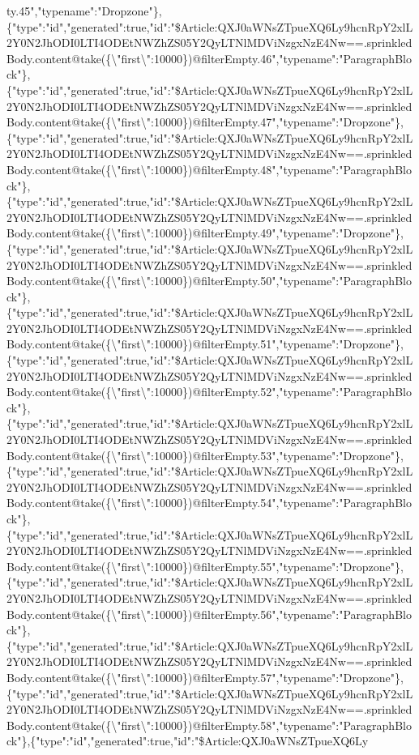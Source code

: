 ty.45","typename":"Dropzone"\},\{"type":"id","generated":true,"id":"\$Article:QXJ0aWNsZTpueXQ6Ly9hcnRpY2xlL2Y0N2JhODI0LTI4ODEtNWZhZS05Y2QyLTNlMDViNzgxNzE4Nw==.sprinkledBody.content@take(\{\textbackslash{}"first\textbackslash{}":10000\})@filterEmpty.46","typename":"ParagraphBlock"\},\{"type":"id","generated":true,"id":"\$Article:QXJ0aWNsZTpueXQ6Ly9hcnRpY2xlL2Y0N2JhODI0LTI4ODEtNWZhZS05Y2QyLTNlMDViNzgxNzE4Nw==.sprinkledBody.content@take(\{\textbackslash{}"first\textbackslash{}":10000\})@filterEmpty.47","typename":"Dropzone"\},\{"type":"id","generated":true,"id":"\$Article:QXJ0aWNsZTpueXQ6Ly9hcnRpY2xlL2Y0N2JhODI0LTI4ODEtNWZhZS05Y2QyLTNlMDViNzgxNzE4Nw==.sprinkledBody.content@take(\{\textbackslash{}"first\textbackslash{}":10000\})@filterEmpty.48","typename":"ParagraphBlock"\},\{"type":"id","generated":true,"id":"\$Article:QXJ0aWNsZTpueXQ6Ly9hcnRpY2xlL2Y0N2JhODI0LTI4ODEtNWZhZS05Y2QyLTNlMDViNzgxNzE4Nw==.sprinkledBody.content@take(\{\textbackslash{}"first\textbackslash{}":10000\})@filterEmpty.49","typename":"Dropzone"\},\{"type":"id","generated":true,"id":"\$Article:QXJ0aWNsZTpueXQ6Ly9hcnRpY2xlL2Y0N2JhODI0LTI4ODEtNWZhZS05Y2QyLTNlMDViNzgxNzE4Nw==.sprinkledBody.content@take(\{\textbackslash{}"first\textbackslash{}":10000\})@filterEmpty.50","typename":"ParagraphBlock"\},\{"type":"id","generated":true,"id":"\$Article:QXJ0aWNsZTpueXQ6Ly9hcnRpY2xlL2Y0N2JhODI0LTI4ODEtNWZhZS05Y2QyLTNlMDViNzgxNzE4Nw==.sprinkledBody.content@take(\{\textbackslash{}"first\textbackslash{}":10000\})@filterEmpty.51","typename":"Dropzone"\},\{"type":"id","generated":true,"id":"\$Article:QXJ0aWNsZTpueXQ6Ly9hcnRpY2xlL2Y0N2JhODI0LTI4ODEtNWZhZS05Y2QyLTNlMDViNzgxNzE4Nw==.sprinkledBody.content@take(\{\textbackslash{}"first\textbackslash{}":10000\})@filterEmpty.52","typename":"ParagraphBlock"\},\{"type":"id","generated":true,"id":"\$Article:QXJ0aWNsZTpueXQ6Ly9hcnRpY2xlL2Y0N2JhODI0LTI4ODEtNWZhZS05Y2QyLTNlMDViNzgxNzE4Nw==.sprinkledBody.content@take(\{\textbackslash{}"first\textbackslash{}":10000\})@filterEmpty.53","typename":"Dropzone"\},\{"type":"id","generated":true,"id":"\$Article:QXJ0aWNsZTpueXQ6Ly9hcnRpY2xlL2Y0N2JhODI0LTI4ODEtNWZhZS05Y2QyLTNlMDViNzgxNzE4Nw==.sprinkledBody.content@take(\{\textbackslash{}"first\textbackslash{}":10000\})@filterEmpty.54","typename":"ParagraphBlock"\},\{"type":"id","generated":true,"id":"\$Article:QXJ0aWNsZTpueXQ6Ly9hcnRpY2xlL2Y0N2JhODI0LTI4ODEtNWZhZS05Y2QyLTNlMDViNzgxNzE4Nw==.sprinkledBody.content@take(\{\textbackslash{}"first\textbackslash{}":10000\})@filterEmpty.55","typename":"Dropzone"\},\{"type":"id","generated":true,"id":"\$Article:QXJ0aWNsZTpueXQ6Ly9hcnRpY2xlL2Y0N2JhODI0LTI4ODEtNWZhZS05Y2QyLTNlMDViNzgxNzE4Nw==.sprinkledBody.content@take(\{\textbackslash{}"first\textbackslash{}":10000\})@filterEmpty.56","typename":"ParagraphBlock"\},\{"type":"id","generated":true,"id":"\$Article:QXJ0aWNsZTpueXQ6Ly9hcnRpY2xlL2Y0N2JhODI0LTI4ODEtNWZhZS05Y2QyLTNlMDViNzgxNzE4Nw==.sprinkledBody.content@take(\{\textbackslash{}"first\textbackslash{}":10000\})@filterEmpty.57","typename":"Dropzone"\},\{"type":"id","generated":true,"id":"\$Article:QXJ0aWNsZTpueXQ6Ly9hcnRpY2xlL2Y0N2JhODI0LTI4ODEtNWZhZS05Y2QyLTNlMDViNzgxNzE4Nw==.sprinkledBody.content@take(\{\textbackslash{}"first\textbackslash{}":10000\})@filterEmpty.58","typename":"ParagraphBlock"\},\{"type":"id","generated":true,"id":"\$Article:QXJ0aWNsZTpueXQ6Ly
